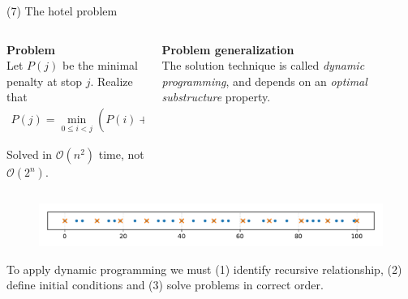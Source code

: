 \documentclass[11pt, aspectratio=149]{beamer}
\theoremstyle{plain}
\begin{document}
\begin{frame}[fragile, t]{(7) The hotel problem}
	\begin{columns}
		\begin{column}{0.5\textwidth}
			\textbf{Problem} \\ 
			Let $P(j)$ be the minimal penalty at stop $j$.
			Realize that
			\begin{align*}
			P(j) = \min_{ 0 \leq i < j}
			\left( P(i) + (M - (h_j - h_i))^2 \right).
			\end{align*}
			
			Solved in $\mathcal{O}(n^2)$ time, not $\mathcal{O}(2^n)$.
			
		\end{column}
		\begin{column}{0.5\textwidth}%
			\textbf{Problem generalization} \\ \vspace*{0.5em} 
			The solution technique is called \emph{dynamic programming}, and depends on an \emph{optimal substructure} property.
		\end{column}
	\end{columns}
	
		\begin{figure}
			\centering
			\includegraphics[width=1\linewidth]{figs/hotel_problem_instance_large_solution.pdf}
		\end{figure}
		\vspace*{-1em}
		{\small To apply dynamic programming we must (1) identify recursive relationship, (2) define initial conditions and (3) solve problems in correct order.}
\end{frame}


\end{document}
